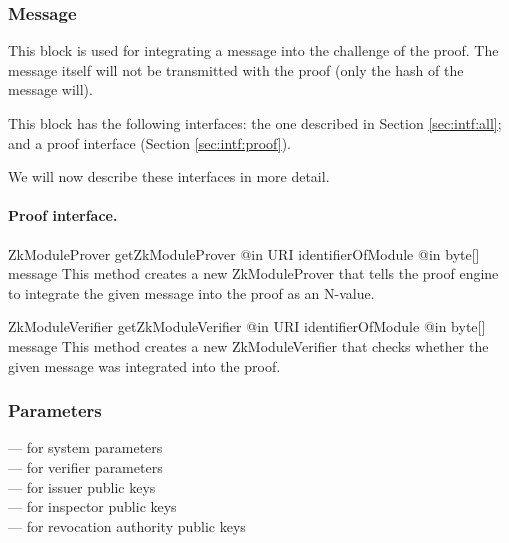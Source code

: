     \subsubsection{Message}

    This block is used for integrating a message into the
    challenge of the proof. The message itself will not be transmitted
    with the proof (only the hash of the message will).

    This block has the following interfaces:
    the one described in Section \ref{sec:intf:all};
    and a proof interface (Section \ref{sec:intf:proof}).

    We will now describe these interfaces in more detail.

    \paragraph{Proof interface.}
      \begin{method}
      {ZkModuleProver}
      {getZkModuleProver}
      {
        {@in URI identifierOfModule}
        {@in byte[] message}
      }
      This method creates a new ZkModuleProver that tells the proof engine to
      integrate the given message into the proof as an N-value.
      \end{method}
      \begin{method}
      {ZkModuleVerifier}
      {getZkModuleVerifier}
      {
        {@in URI identifierOfModule}
        {@in byte[] message}
      }
      This method creates a new ZkModuleVerifier that checks whether the
      given message was integrated into the proof.
      \end{method}

    \subsubsection{Parameters}
     --- for system parameters\\
     --- for verifier parameters\\
     --- for issuer public keys\\
     --- for inspector public keys\\
     --- for revocation authority public keys

